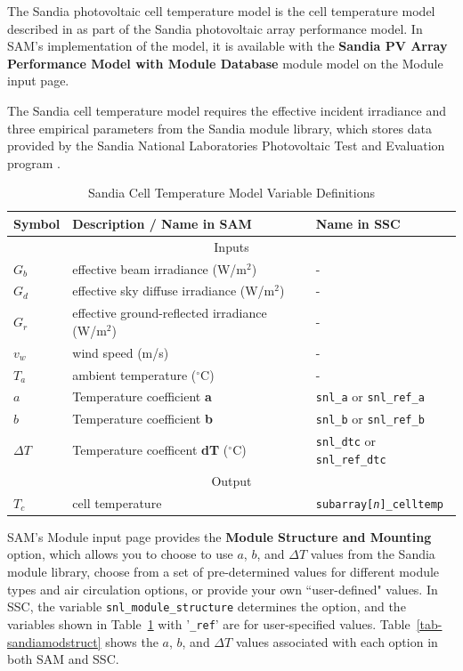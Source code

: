 \documentclass[12pt,letterpaper]{article}
\begin{document}
The Sandia photovoltaic cell temperature model is the cell temperature model described in \citet{king2004} as part of the Sandia photovoltaic array performance model. In SAM's implementation of the model, it is available with the \textbf{Sandia PV Array Performance Model with Module Database} module model on the Module input page.

The Sandia cell temperature model requires the effective incident irradiance and three empirical parameters from the Sandia module library, which stores data provided by the Sandia National Laboratories Photovoltaic Test and Evaluation program \citep{sandia-testeval}.

\begin{table}
\begin{center}
\caption{Sandia Cell Temperature Model Variable Definitions}
\begin{tabular}{lll}
\midrule
Symbol & Description / \textbf{Name in SAM} & Name in SSC \\
\midrule
\multicolumn{3}{c}{Inputs}\\
$G_b$ & effective beam irradiance (W/m$^2$)& - \\
$G_d$ & effective sky diffuse irradiance (W/m$^2$) & - \\
$G_r$ & effective ground-reflected irradiance (W/m$^2$) & - \\
$v_{w}$ & wind speed (m/s) & - \\
$T_{a}$ & ambient temperature ($^\circ$C) & - \\
$a$ & Temperature coefficient \textbf{a} & \texttt{snl\_a} or \texttt{snl\_ref\_a}\\
$b$ &  Temperature coefficient \textbf{b} & \texttt{snl\_b} or \texttt{snl\_ref\_b}\\
$\Delta T$ & Temperature coefficent \textbf{dT} ($^\circ$C) & \texttt{snl\_dtc} or \texttt{snl\_ref\_dtc} \\
\midrule
\multicolumn{3}{c}{Output}\\
$T_c$ & cell temperature & \texttt{subarray[\textit{n}]\_celltemp} \\
\hline
\end{tabular}
\label{tab-tempsandia}
\end{center}
\end{table}

SAM's Module input page provides the \textbf{Module Structure and Mounting} option, which allows you to choose to use $a$, $b$, and $\Delta T$ values from the Sandia module library, choose from a set of pre-determined values for different module types and air circulation options, or provide your own ``user-defined" values. In SSC, the variable \texttt{snl\_module\_structure} determines the option, and the variables shown in Table~\ref{tab-tempsandia} with '\texttt{\_ref}' are for user-specified values. Table~\ref{tab-sandiamodstruct} shows the $a$, $b$, and $\Delta T$ values associated with each option in both SAM and SSC.
\end{document}
